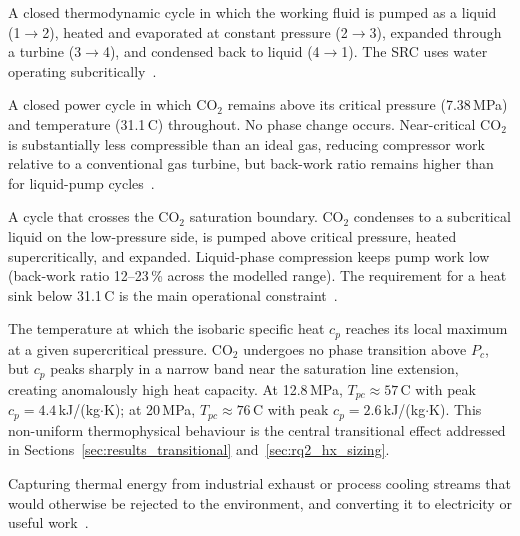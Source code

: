 \begin{description}[leftmargin=2em,style=nextline]\sloppy

\item[\textbf{Rankine Cycle (RC):}]
A closed thermodynamic cycle in which the working fluid is pumped as a
liquid (1$\to$2), heated and evaporated at constant pressure (2$\to$3),
expanded through a turbine (3$\to$4), and condensed back to liquid
(4$\to$1). The SRC uses water operating subcritically~\cite{Moran2018}.

\item[\textbf{Supercritical CO$_2$ (sCO$_2$) Brayton Cycle:}]
A closed power cycle in which CO$_2$ remains above its critical pressure
(7.38\,MPa) and temperature (31.1\,\textdegree C) throughout. No phase
change occurs. Near-critical CO$_2$ is substantially less compressible than
an ideal gas, reducing compressor work relative to a conventional gas
turbine, but back-work ratio remains higher than for liquid-pump
cycles~\cite{Dostal2004,Crespi2017}.

\item[\textbf{Transcritical CO$_2$ (tCO$_2$) Rankine Cycle:}]
A cycle that crosses the CO$_2$ saturation boundary. CO$_2$ condenses to a
subcritical liquid on the low-pressure side, is pumped above critical
pressure, heated supercritically, and expanded. Liquid-phase compression
keeps pump work low (back-work ratio 12--23\,\% across the modelled range).
The requirement for a heat sink below 31.1\,\textdegree C is the main
operational constraint~\cite{Jiang2023,Lee2023}.

\item[\textbf{Pseudo-Critical Temperature ($T_{pc}$):}]
The temperature at which the isobaric specific heat $c_p$ reaches its local
maximum at a given supercritical pressure. CO$_2$ undergoes no phase
transition above $P_c$, but $c_p$ peaks sharply in a narrow band near the
saturation line extension, creating anomalously high heat capacity. At
12.8\,MPa, $T_{pc} \approx 57$\,\textdegree C with peak $c_p =
4.4$\,kJ/(kg$\cdot$K); at 20\,MPa, $T_{pc} \approx 76$\,\textdegree C
with peak $c_p = 2.6$\,kJ/(kg$\cdot$K). This non-uniform thermophysical
behaviour is the central transitional effect addressed in
Sections~\ref{sec:results_transitional} and~\ref{sec:rq2_hx_sizing}.

\item[\textbf{Waste Heat Recovery (WHR):}]
Capturing thermal energy from industrial exhaust or process cooling streams
that would otherwise be rejected to the environment, and converting it to
electricity or useful work~\cite{Papapetrou2018}.


\end{description}

